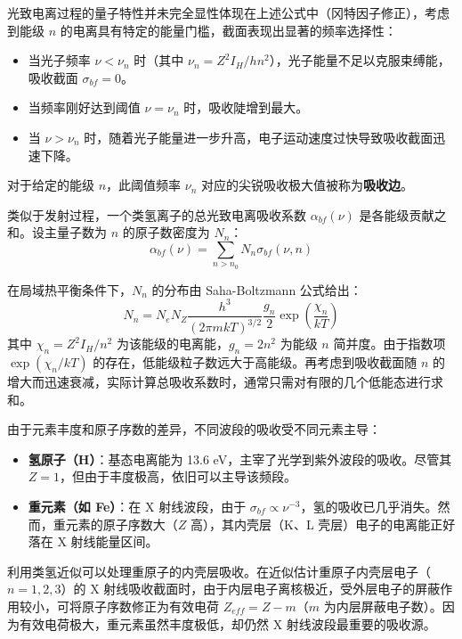 光致电离过程的量子特性并未完全显性体现在上述公式中（冈特因子修正），考虑到能级 $n$ 的电离具有特定的能量门槛，截面表现出显著的频率选择性：
\begin{itemize}
    \item 当光子频率 $\nu < \nu_n$ 时（其中 $\nu_n = Z^2 I_H / hn^2$），光子能量不足以克服束缚能，吸收截面 $\sigma_{bf} = 0$。
    \item 当频率刚好达到阈值 $\nu = \nu_n$ 时，吸收陡增到最大。
    \item 当 $\nu > \nu_n$ 时，随着光子能量进一步升高，电子运动速度过快导致吸收截面迅速下降。
\end{itemize}
对于给定的能级 $n$，此阈值频率 $\nu_n$ 对应的尖锐吸收极大值被称为\textbf{吸收边}。

类似于发射过程，一个类氢离子的总光致电离吸收系数 $\alpha_{bf}(\nu)$ 是各能级贡献之和。设主量子数为 $n$ 的原子数密度为 $N_n$：
\begin{equation}
    \alpha_{bf}(\nu) = \sum_{n > n_0} N_n \sigma_{bf}(\nu, n)
\end{equation}


在局域热平衡条件下，$N_n$ 的分布由 Saha-Boltzmann 公式给出：
\begin{equation}\label{eq:saha_boltzmann}
    N_n = N_e N_Z \frac{h^3}{(2\pi mkT)^{3/2}} \frac{g_n}{2} \exp\left( \frac{\chi_n}{kT} \right)
\end{equation}
其中 $\chi_n = Z^2 I_H / n^2$ 为该能级的电离能，$g_n = 2n^2$ 为能级 $n$ 简并度。由于指数项 $\exp(\chi_n/kT)$ 的存在，低能级粒子数远大于高能级。再考虑到吸收截面随 $n$ 的增大而迅速衰减，实际计算总吸收系数时，通常只需对有限的几个低能态进行求和。

\begin{derivationnote}[天体环境中的吸收主导机制]
    由于元素丰度和原子序数的差异，不同波段的吸收受不同元素主导：
    \begin{itemize}
        \item \textbf{氢原子（H）}：基态电离能为 13.6 eV，主宰了光学到紫外波段的吸收。尽管其 $Z=1$，但由于丰度极高，依旧可以主导该频段。
        \item \textbf{重元素（如 Fe）}：在 X 射线波段，由于 $\sigma_{bf} \propto \nu^{-3}$，氢的吸收已几乎消失。然而，重元素的原子序数大（$Z$ 高），其内壳层（K、L 壳层）电子的电离能正好落在 X 射线能量区间。
    \end{itemize}
    利用类氢近似可以处理重原子的内壳层吸收。在近似估计重原子内壳层电子（$n=1,2,3$）的 X 射线吸收截面时，由于内层电子离核极近，受外层电子的屏蔽作用较小，可将原子序数修正为有效电荷 $Z_{eff} = Z - m$（$m$ 为内层屏蔽电子数）。因为有效电荷极大，重元素虽然丰度极低，却仍然 X 射线波段最重要的吸收源。
\end{derivationnote}

